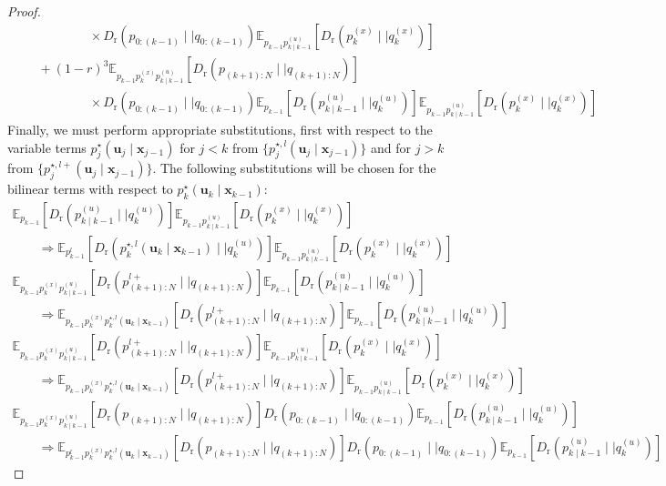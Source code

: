 \documentclass[a4paper,fleqn]{cas-sc}
\newcommand{\E}{\mathbb{E}}
\newcommand{\bv}[1]{\mathbf{#1}}
\newcommand{\Dr}[2]{{D}_{\text{r}}\left(#1\mid \mid #2 \right)}
\newcommand{\shortplant}[1]{p_{{#1}}^{(x)}}
\newcommand{\shortpolicy}[2]{p_{{#1}\mid{#2}}^{(u)}}
\newcommand{\optimalpolicy}[2]{p^{\star}_{{#1}} \left(\bv{u}_{{#1}}\mid \bv{x}_{{#2}} \right)}
\newcommand{\optimalpolicygen}[3]{p^{\star,{#3}}_{{#1}} \left(\bv{u}_{{#1}}\mid \bv{x}_{{#2}} \right)}
\begin{document}
\begin{proof}
\begin{equation}
\begin{array}{l}
\qquad\qquad\qquad \times \Dr{p_{0:(k-1)}}{q_{0:(k-1)}}\E_{p_{k-1}\shortpolicy{k}{k-1}}\left[\Dr{\shortplant{k}}{q^{(x)}_k}\right] 
\\ \qquad + (1-r)^3  \E_{p_{k-1}\shortplant{k}\shortpolicy{k}{k-1}}\left[\Dr{p_{(k+1):N}}{q_{(k+1):N}}\right] \\ 
\qquad\qquad\qquad \times \Dr{p_{0:(k-1)}}{q_{0:(k-1)}}\E_{p_{k-1}}\left[\Dr{\shortpolicy{k}{k-1}}{q^{(u)}_k}\right]\E_{p_{k-1}\shortpolicy{k}{k-1}}\left[\Dr{\shortplant{k}}{q^{(x)}_k}\right]
\end{array}
\end{equation}
Finally, we must perform appropriate substitutions, first with respect to the variable terms $\optimalpolicy{j}{j-1}$ for $j<k$ from $\{\optimalpolicygen{j}{j-1}{l}\}$
and for $j>k$ from $\{\optimalpolicygen{j}{j-1}{l+}\}$. The following substitutions will be chosen for the bilinear terms with respect to $\optimalpolicy{k}{k-1}$:
\[
\begin{array}{l}
\E_{p_{k-1}}\left[\Dr{\shortpolicy{k}{k-1}}{q^{(u)}_k}\right]\E_{p_{k-1}\shortpolicy{k}{k-1}}\left[\Dr{\shortplant{k}}{q^{(x)}_k}\right] \\ \qquad \Rightarrow
\E_{p^l_{k-1}}\left[\Dr{\optimalpolicygen{k}{k-1}{l}}{q^{(u)}_k}\right]\E_{p_{k-1}\shortpolicy{k}{k-1}}\left[\Dr{\shortplant{k}}{q^{(x)}_k}\right]
\\ 
\E_{p_{k-1}\shortplant{k}\shortpolicy{k}{k-1}}\left[\Dr{p^{l+}_{(k+1):N}}{q_{(k+1):N}}\right]
\E_{p_{k-1}}\left[\Dr{\shortpolicy{k}{k-1}}{q^{(u)}_k}\right] \\ \qquad 
\Rightarrow 
\E_{p_{k-1}\shortplant{k}\optimalpolicygen{k}{k-1}{l}}\left[\Dr{p^{l+}_{(k+1):N}}{q_{(k+1):N}}\right]
\E_{p_{k-1}}\left[\Dr{\shortpolicy{k}{k-1}}{q^{(u)}_k}\right]
\\ 
 \E_{p_{k-1}\shortplant{k}\shortpolicy{k}{k-1}}\left[\Dr{p^{l+}_{(k+1):N}}{q_{(k+1):N}}\right]
\E_{p_{k-1}\shortpolicy{k}{k-1}}\left[\Dr{\shortplant{k}}{q^{(x)}_k}\right] \\ \qquad  \Rightarrow
\E_{p_{k-1}\shortplant{k}\optimalpolicygen{k}{k-1}{l}}\left[\Dr{p^{l+}_{(k+1):N}}{q_{(k+1):N}}\right]
\E_{p_{k-1}\shortpolicy{k}{k-1}}\left[\Dr{\shortplant{k}}{q^{(x)}_k}\right]
 \\ 
 \E_{p_{k-1}\shortplant{k}\shortpolicy{k}{k-1}}\left[\Dr{p_{(k+1):N}}{q_{(k+1):N}}\right] \Dr{p_{0:(k-1)}}{q_{0:(k-1)}}\E_{p_{k-1}}\left[\Dr{\shortpolicy{k}{k-1}}{q^{(u)}_k}\right] \\ \qquad \Rightarrow
  \E_{p^l_{k-1}\shortplant{k}\optimalpolicygen{k}{k-1}{l}}\left[\Dr{p_{(k+1):N}}{q_{(k+1):N}}\right] \Dr{p_{0:(k-1)}}{q_{0:(k-1)}}\E_{p_{k-1}}\left[\Dr{\shortpolicy{k}{k-1}}{q^{(u)}_k}\right] 

\end{array}\]
\end{proof}
\end{document}
